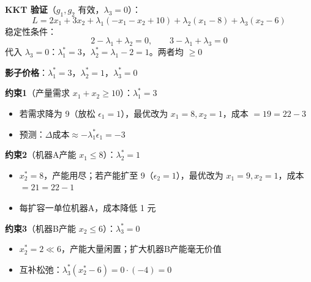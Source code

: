 \documentclass[12pt, a4paper]{ctexart}
\begin{document}
\begin{blackboard}[影子价格的计算与解释]

\textbf{KKT 验证}（$g_1, g_2$ 有效，$\lambda_3=0$）：
\[
L = 2x_1 + 3x_2 + \lambda_1(-x_1-x_2+10) + \lambda_2(x_1-8) + \lambda_3(x_2-6)
\]
稳定性条件：
\[
2 - \lambda_1 + \lambda_2 = 0, \qquad 3 - \lambda_1 + \lambda_3 = 0
\]
代入 $\lambda_3 = 0$：$\lambda_1^* = 3$，$\lambda_2^* = \lambda_1-2 = 1$。两者均 $\geq 0$ \checkmark

\textbf{影子价格}：$\lambda_1^* = 3$，$\lambda_2^* = 1$，$\lambda_3^* = 0$

\medskip
\textbf{约束1}（产量需求 $x_1+x_2 \geq 10$）：$\lambda_1^* = 3$
\begin{itemize}
    \item 若需求降为 9（放松 $\epsilon_1=1$），最优改为 $x_1=8, x_2=1$，成本 $= 19 = 22 - 3$ \checkmark
    \item 预测：$\Delta \text{成本} \approx -\lambda_1^* \epsilon_1 = -3$
\end{itemize}

\textbf{约束2}（机器A产能 $x_1 \leq 8$）：$\lambda_2^* = 1$
\begin{itemize}
    \item $x_2^* = 8$，产能用尽；若产能扩至 9（$\epsilon_2=1$），最优改为 $x_1=9, x_2=1$，成本 $= 21 = 22 - 1$ \checkmark
    \item 每扩容一单位机器A，成本降低 1 元
\end{itemize}

\textbf{约束3}（机器B产能 $x_2 \leq 6$）：$\lambda_3^* = 0$
\begin{itemize}
    \item $x_2^* = 2 \ll 6$，产能大量闲置；扩大机器B产能毫无价值
    \item 互补松弛：$\lambda_3^*(x_2^*-6)=0 \cdot(-4)=0$ \checkmark
\end{itemize}

\end{blackboard}
\end{document}
